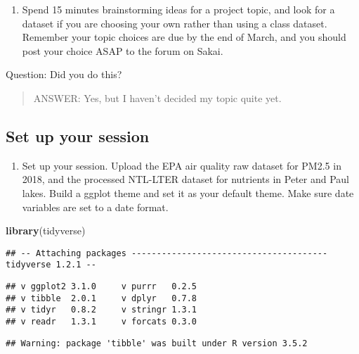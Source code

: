 \documentclass[]{article}
\newenvironment{Shaded}{\begin{snugshade}}{\end{snugshade}}
\newcommand{\KeywordTok}[1]{\textcolor[rgb]{0.13,0.29,0.53}{\textbf{#1}}}
\newcommand{\NormalTok}[1]{#1}
\providecommand{\tightlist}{%
  \setlength{\itemsep}{0pt}\setlength{\parskip}{0pt}}
\begin{document}
\begin{enumerate}
\def\labelenumi{\arabic{enumi}.}
\tightlist
\item
  Spend 15 minutes brainstorming ideas for a project topic, and look for
  a dataset if you are choosing your own rather than using a class
  dataset. Remember your topic choices are due by the end of March, and
  you should post your choice ASAP to the forum on Sakai.
\end{enumerate}

Question: Did you do this?

\begin{quote}
ANSWER: Yes, but I haven't decided my topic quite yet.
\end{quote}

\subsection{Set up your session}\label{set-up-your-session}

\begin{enumerate}
\def\labelenumi{\arabic{enumi}.}
\setcounter{enumi}{1}
\tightlist
\item
  Set up your session. Upload the EPA air quality raw dataset for PM2.5
  in 2018, and the processed NTL-LTER dataset for nutrients in Peter and
  Paul lakes. Build a ggplot theme and set it as your default theme.
  Make sure date variables are set to a date format.
\end{enumerate}

\begin{Shaded}
\begin{Highlighting}[]
\KeywordTok{library}\NormalTok{(tidyverse)}
\end{Highlighting}
\end{Shaded}

\begin{verbatim}
## -- Attaching packages --------------------------------------- tidyverse 1.2.1 --
\end{verbatim}

\begin{verbatim}
## v ggplot2 3.1.0     v purrr   0.2.5
## v tibble  2.0.1     v dplyr   0.7.8
## v tidyr   0.8.2     v stringr 1.3.1
## v readr   1.3.1     v forcats 0.3.0
\end{verbatim}

\begin{verbatim}
## Warning: package 'tibble' was built under R version 3.5.2
\end{verbatim}
\end{document}

